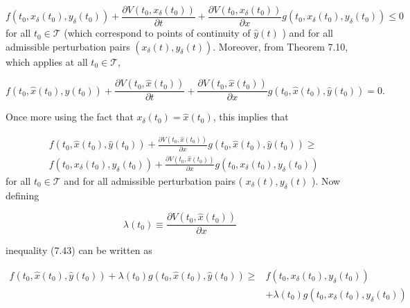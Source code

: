 \documentclass[\topdir/lecture_notes.tex]{subfiles}
\begin{document}
\[
f\left(t_{0}, x_{\delta}\left(t_{0}\right), y_{\delta}\left(t_{0}\right)\right)+\frac{\partial V\left(t_{0}, x_{\delta}\left(t_{0}\right)\right)}{\partial t}+\frac{\partial V\left(t_{0}, x_{\delta}\left(t_{0}\right)\right)}{\partial x} g\left(t_{0}, x_{\delta}\left(t_{0}\right), y_{\delta}\left(t_{0}\right)\right) \leq 0
\]
for all $t_{0} \in \mathcal{T}$ (which correspond to points of continuity of $\hat{y}(t)$ ) and for all admissible perturbation pairs $\left(x_{\delta}(t), y_{\delta}(t)\right)$. Moreover, from Theorem 7.10, which applies at all $t_{0} \in \mathcal{T}$,

\[
f\left(t_{0}, \hat{x}\left(t_{0}\right), \hat{y}\left(t_{0}\right)\right)+\frac{\partial V\left(t_{0}, \hat{x}\left(t_{0}\right)\right)}{\partial t}+\frac{\partial V\left(t_{0}, \hat{x}\left(t_{0}\right)\right)}{\partial x} g\left(t_{0}, \hat{x}\left(t_{0}\right), \hat{y}\left(t_{0}\right)\right)=0 .
\]

Once more using the fact that $x_{\delta}\left(t_{0}\right)=\hat{x}\left(t_{0}\right)$, this implies that

\[
\begin{aligned}
& f\left(t_{0}, \hat{x}\left(t_{0}\right), \hat{y}\left(t_{0}\right)\right)+\frac{\partial V\left(t_{0}, \hat{x}\left(t_{0}\right)\right)}{\partial x} g\left(t_{0}, \hat{x}\left(t_{0}\right), \hat{y}\left(t_{0}\right)\right) \geq \\
& f\left(t_{0}, x_{\delta}\left(t_{0}\right), y_{\delta}\left(t_{0}\right)\right)+\frac{\partial V\left(t_{0}, \hat{x}\left(t_{0}\right)\right)}{\partial x} g\left(t_{0}, x_{\delta}\left(t_{0}\right), y_{\delta}\left(t_{0}\right)\right)
\end{aligned}
\]
for all $t_{0} \in \mathcal{T}$ and for all admissible perturbation pairs ( $x_{\delta}(t), y_{\delta}(t)$ ). Now defining

\[
\lambda\left(t_{0}\right) \equiv \frac{\partial V\left(t_{0}, \hat{x}\left(t_{0}\right)\right)}{\partial x}
\]

inequality (7.43) can be written as

\[
\begin{aligned}
f\left(t_{0}, \hat{x}\left(t_{0}\right), \hat{y}\left(t_{0}\right)\right)+\lambda\left(t_{0}\right) g\left(t_{0}, \hat{x}\left(t_{0}\right), \hat{y}\left(t_{0}\right)\right) \geq & f\left(t_{0}, x_{\delta}\left(t_{0}\right), y_{\delta}\left(t_{0}\right)\right) \\
& +\lambda\left(t_{0}\right) g\left(t_{0}, x_{\delta}\left(t_{0}\right), y_{\delta}\left(t_{0}\right)\right)
\end{aligned}
\]
\end{document}

